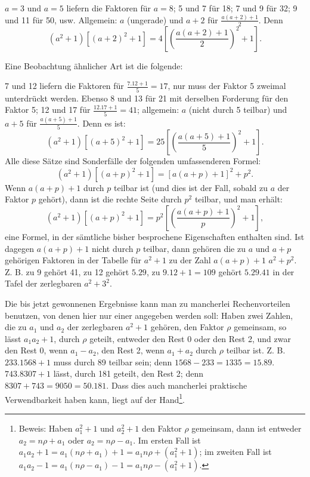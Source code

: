$a=3$ und $a=5$ liefern die Faktoren für $a=8$; 5 und 7 für 18; 7
und 9 für 32; 9 und 11 für 50, usw. Allgemein: $a$ (ungerade) und $a+2$
für $\frac{a(a+2)+1}{2}$. Denn
\[
(a^2+1)[(a+2)^2+1]=4\left[\left(\frac{a(a+2)+1}{2}\right)^2+1\right].
\]

Eine Beobachtung ähnlicher Art ist die folgende:

7 und 12 liefern die Faktoren für $\frac{7\mathord{.}12+1}{5}=17$, nur muss der Faktor 5
zweimal unterdrückt werden. Ebenso 8 und 13 für 21 mit derselben Forderung für den Faktor 5; 12 und 17 für $\frac{12\mathord{.}17+1}{5}=41$; allgemein: $a$ (nicht
durch 5 teilbar) und $a+5$ für $\frac{a(a+5)+1}{5}$. Denn es ist:
\[
(a^2+1)[(a+5)^2+1]=25\left[\left(\frac{a(a+5)+1}{5}\right)^2+1\right].
\]
\noindent Alle diese Sätze sind Sonderfälle der folgenden umfassenderen Formel:
\[
(a^2+1)[(a+p)^2+1]=[a(a+p)+1]^2+p^2.
\]
\noindent Wenn $a(a+p)+1$ durch $p$ teilbar ist (und dies ist der Fall, sobald zu $a$ der
Faktor $p$ gehört), dann ist die rechte Seite durch $p^2$ teilbar, und man erhält:
\[
(a^2+1)[(a+p)^2+1]=p^2\left[\left(\frac{a(a+p)+1}{p}\right)^2+1\right],
\]
\noindent eine Formel, in der sämtliche bisher besprochene Eigenschaften enthalten
sind. Ist dagegen $a(a+p)+1$ nicht durch $p$ teilbar, dann gehören die zu $a$
und $a+p$ gehörigen Faktoren in der Tabelle für $a^2+1$ zu der Zahl $a(a+p)+1$
\clearpage{}
\setcounter{footnote}{0}
\noindent {} $a^2+p^2$. Z. B. zu 9 gehört 41, zu 12 gehört $5\mathord{.}29$, zu
$9\mathord{.}12+1=109$ gehört $5\mathord{.}29\mathord{.}41$ in der Tafel der zerlegbaren $a^2+3^2$.

Die bis jetzt gewonnenen Ergebnisse kann man zu mancherlei Rechenvorteilen benutzen, von denen hier nur einer angegeben werden soll: Haben
zwei Zahlen, die zu $a_1$ und $a_2$ der zerlegbaren $a^2+1$ gehören, den Faktor $\rho$
gemeinsam, so lässt $a_1a_2+1$, durch $\rho$ geteilt, entweder den Rest 0 oder den
Rest 2, und zwar den Rest 0, wenn $a_1-a_2$, den Rest 2, wenn $a_1+a_2$ durch
$\rho$ teilbar ist. Z. B. $233\mathord{.}1568+1$ muss durch 89 teilbar sein; denn $1568-233=1335=15\mathord{.}89$.
$743\mathord{.}8307+1$ lässt, durch 181 geteilt, den Rest 2;
denn $8307+743=9050=50\mathord{.}181$. Dass dies auch mancherlei praktische
Verwendbarkeit haben kann, liegt auf der Hand\footnote{Beweis: Haben $a_1^2+1$ und $a_2^2+1$ den Faktor $\rho$ gemeinsam, dann ist entweder $a_2=n\rho+a_1$ oder $a_2=n\rho-a_1$. Im ersten Fall ist $a_1a_2+1=a_1(n\rho+a_1)+1=a_1n\rho+(a_1^2+1)$; im zweiten Fall ist $a_1a_2-1=a_1(n\rho-a_1)-1=a_1n\rho-(a_1^2+1)$.}.


